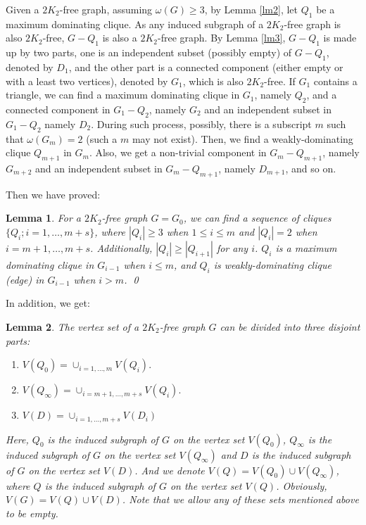 \documentclass{amsart}
\newtheorem{lemma}{Lemma}
\begin{document}
Given a $2K_2$-free graph, assuming $\omega(G)\ge3$, by Lemma \ref{lm2}, let
$Q_1$ be a maximum dominating clique. As any induced subgraph of a $2K_2$-free
graph is also $2K_2$-free, $G-Q_1$ is also a $2K_2$-free graph.  By Lemma
\ref{lm3}, $G-Q_1$ is made up by two parts, one is an independent subset
(possibly empty) of $G-Q_1$, denoted by $D_1$, and the other part is a connected
component (either empty or with a least two vertices), denoted by $G_1$, which is also
$2K_2$-free. If $G_1$ contains a triangle, we can find a maximum dominating clique in
$G_1$, namely $Q_2$, and a connected component in $G_1-Q_2$, namely $G_2$ and
an independent subset in $G_1-Q_2$ namely $D_2$. During such process, possibly,
there is a subscript $m$ such that $\omega(G_m)=2$ (such a $m$ may not exist).
Then, we find a weakly-dominating clique $Q_{m+1}$ in $G_m$. Also, we get a
non-trivial component in $G_m-Q_{m+1}$, namely $G_{m+2}$ and an independent
subset in $G_m-Q_{m+1}$, namely $D_{m+1}$, and so on.

Then we have proved:
\begin{lemma}\label{lm5}
For a $2K_2$-free graph $G=G_0$, we can find a sequence of cliques $\{Q_i;i=1,\ldots,m+s\}$, where $|Q_i|\ge3$ when $1\le i\le m$ and $|Q_i|=2$ when $i=m+1,\ldots,m+s$. Additionally, $|Q_i|\ge|Q_{i+1}|$ for any $i$. $Q_i$ is a maximum dominating clique in $G_{i-1}$ when $i\le m$, and $Q_i$ is weakly-dominating clique (edge) in $G_{i-1}$ when $i>m$. \qed
\end{lemma}


In addition, we get:

\begin{lemma}\label{lm6}
The vertex set of a $2K_2$-free graph $G$ can be divided into three disjoint parts:
\begin{enumerate}
\item $V(Q_0)=\cup_{i=1,\ldots,m}V(Q_i).$
\item $V(Q_{\infty})=\cup_{i=m+1,\ldots,m+s}V(Q_i).$
\item $V(D)=\cup_{i=1,\ldots,m+s}V(D_i)$
\end{enumerate}
Here, $Q_0$ is the induced subgraph of $G$ on the vertex set $V(Q_0)$, $Q_{\infty}$ is the induced subgraph of $G$ on the vertex set $V(Q_{\infty})$ and $D$ is the induced subgraph of $G$ on the vertex set $V(D)$. And we denote $V(Q)=V(Q_0)\cup V(Q_{\infty})$, where $Q$ is the induced subgraph of $G$ on the vertex set $V(Q)$. Obviously, $V(G)=V(Q)\cup V(D)$. Note that we allow any of these sets mentioned above to be empty.
\end{lemma}
\end{document}
